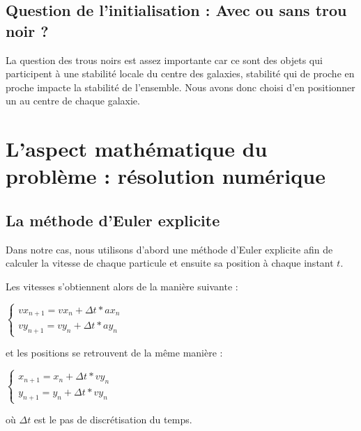 \vspace{3mm}
\subsection{Question de l'initialisation : Avec ou sans trou noir ?}
\vspace{2mm}

La question des trous noirs est assez importante car ce sont des objets qui participent à une stabilité locale du centre des galaxies, stabilité qui de proche en proche impacte la stabilité de l'ensemble. Nous avons donc choisi d'en positionner un au centre de chaque galaxie.

\section{L'aspect mathématique du problème : résolution numérique}

\subsection{La méthode d'Euler explicite}

Dans notre cas, nous utilisons d'abord une méthode d'Euler explicite afin de calculer la vitesse de chaque particule et ensuite sa position à chaque instant $t$.

\vspace{2mm}
Les vitesses s'obtiennent alors de la manière suivante :
\vspace{2mm}

$
\left\{
    \begin{array}{ll}
        vx_{n+1} =vx_{n} + \Delta t *ax_{n} \\
        vy_{n+1} =vy_{n} + \Delta t *ay_{n}
    \end{array}
\right.
$

\vspace{2mm}
et les positions se retrouvent de la même manière :
\vspace{2mm}

$
\left\{
    \begin{array}{ll}
        x_{n+1} =x_{n} + \Delta t *vy_{n} \\
        y_{n+1} =y_{n} + \Delta t *vy_{n}
    \end{array}
\right.
$

\vspace{2mm}

où $\Delta t$ est le pas de discrétisation du temps.

